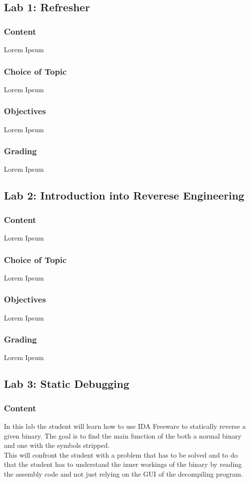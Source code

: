 \subsection{Lab 1: Refresher}
\subsubsection*{Content}
Lorem Ipsum
\subsubsection*{Choice of Topic}
Lorem Ipsum
\subsubsection*{Objectives}
Lorem Ipsum
\subsubsection*{Grading}
Lorem Ipsum

\subsection{Lab 2: Introduction into Reverese Engineering}
\subsubsection*{Content}
Lorem Ipsum
\subsubsection*{Choice of Topic}
Lorem Ipsum
\subsubsection*{Objectives}
Lorem Ipsum
\subsubsection*{Grading}
Lorem Ipsum

\subsection{Lab 3: Static Debugging}
\subsubsection*{Content}
In this lab the student will learn how to use IDA Freeware to statically reverse a given binary. The goal is to find the main function of the both a normal binary and one with the symbols stripped. \\
This will confront the student with a problem that has to be solved and to do that the student has to understand the inner workings of the binary by reading the assembly code and not just relying on the GUI of the decompiling program.
